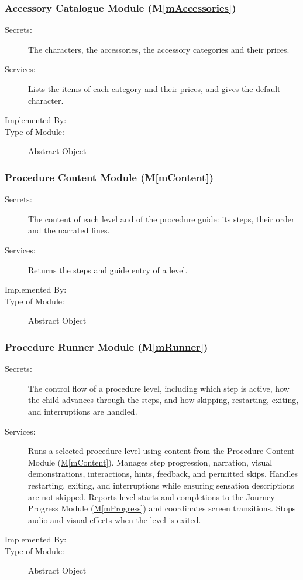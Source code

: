 \documentclass[10pt, titlepage]{article}
\newcommand{\mref}[1]{\texorpdfstring{\hyperref[md:#1]{M\ref*{#1}}}{M\ref*{#1}}}
\newcommand{\mplainref}[1]{M\ref*{#1}}
\begin{document}
\subsubsection{Accessory Catalogue Module (\mplainref{mAccessories})}\label{md:mAccessories}

\begin{description}
\item[Secrets:] The characters, the accessories, the accessory categories and
  their prices.
\item[Services:] Lists the items of each category and their prices, and gives
  the default character.
\item[Implemented By:] \progname{}
\item[Type of Module:] Abstract Object
\end{description}

\subsubsection{Procedure Content Module (\mplainref{mContent})}\label{md:mContent}

\begin{description}
\item[Secrets:] The content of each level and of the procedure guide: its
  steps, their order and the narrated lines.
\item[Services:] Returns the steps and guide entry of a level.
\item[Implemented By:] \progname{}
\item[Type of Module:] Abstract Object
\end{description}

\subsubsection{Procedure Runner Module (\mplainref{mRunner})}\label{md:mRunner}

\begin{description}
\item[Secrets:] The control flow of a procedure level, including which step
  is active, how the child advances through the steps, and how skipping,
  restarting, exiting, and interruptions are handled.
\item[Services:] Runs a selected procedure level using content from the
  Procedure Content Module (\mref{mContent}). Manages step progression, narration, visual
  demonstrations, interactions, hints, feedback, and permitted skips.
  Handles restarting, exiting, and interruptions while ensuring sensation
  descriptions are not skipped. Reports level starts and completions to
  the Journey Progress Module (\mref{mProgress}) and coordinates screen transitions.
  Stops audio and visual effects when the level is exited.
\item[Implemented By:] \progname{}
\item[Type of Module:] Abstract Object
\end{description}
\end{document}
